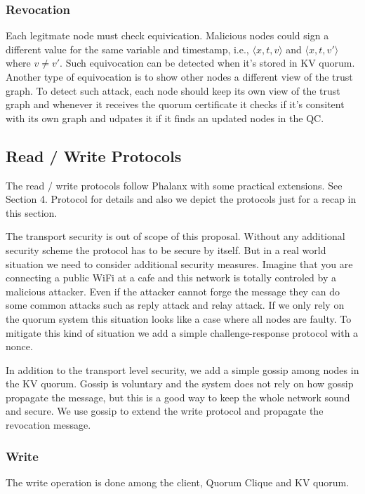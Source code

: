 \documentclass[10pt,fleqn]{article}
\begin{document}
\subsubsection*{Revocation}
Each legitmate node must check equivication. Malicious nodes could sign a different value for the same variable and timestamp, i.e., $\langle x, t, v \rangle$ and $\langle x, t, v' \rangle$ where $v \ne v'$. Such equivocation can be detected when it's stored in KV quorum. Another type of equivocation is to show other nodes a different view of the trust graph. To detect such attack, each node should keep its own view of the trust graph and whenever it receives the quorum certificate it checks if it's consitent with its own graph and udpates it if it finds an updated nodes in the QC.

\subsection{Read / Write Protocols}
The read / write protocols follow Phalanx \cite{phalanx} with some practical extensions. See Section 4. Protocol \cite{bftkv} for details and also we depict the protocols just for a recap in this section.

The transport security is out of scope of this proposal. Without any additional security scheme the protocol has to be secure by itself. But in a real world situation we need to consider additional security measures. Imagine that you are connecting a public WiFi at a cafe and this network is totally controled by a malicious attacker. Even if the attacker cannot forge the message they can do some common attacks such as reply attack and relay attack. If we only rely on the quorum system this situation looks like a case where all nodes are faulty. To mitigate this kind of situation we add a simple challenge-response protocol with a nonce.

In addition to the transport level security, we add a simple gossip among nodes in the KV quorum. Gossip is voluntary and the system does not rely on how gossip propagate the message, but this is a good way to keep the whole network sound and secure. We use gossip to extend the \textsf{write} protocol and propagate the revocation message.

\subsubsection*{Write}
The write operation is done among the client, Quorum Clique and KV quorum. 
\end{document}
